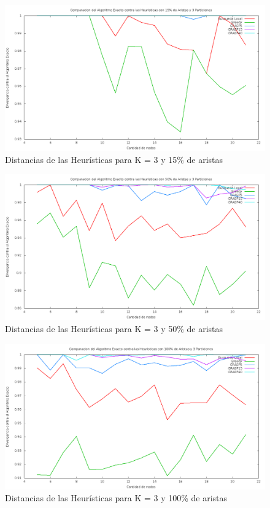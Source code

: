\begin{figure}[H]
\begin{center}
\includegraphics[scale=0.3]{finales/ComparacionesCon3Particiones15Aristas.png}
\caption{Distancias de las Heur\'isticas para K = 3 y 15\% de aristas}
\end{center}
\end{figure}

\begin{figure}[H]
\begin{center}
\includegraphics[scale=0.3]{finales/ComparacionesCon3Particiones50Aristas.png}
\caption{Distancias de las Heur\'isticas para K = 3 y 50\% de aristas}
\end{center}
\end{figure}

\begin{figure}[H]
\begin{center}
\includegraphics[scale=0.3]{finales/ComparacionesCon3Particiones100Aristas.png}
\caption{Distancias de las Heur\'isticas para K = 3 y 100\% de aristas}
\end{center}
\end{figure}


